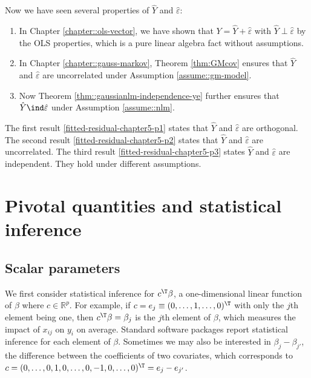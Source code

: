 Now we have seen several properties of $\hat{Y} $ and $  \hat{\varepsilon}$:
\begin{enumerate}[label=(P\arabic*), ref=P\arabic*]
\item\label{fitted-residual-chapter5-p1}
In Chapter \ref{chapter::ols-vector}, we have shown that $Y = \hat{Y}  + \hat{\varepsilon}$ with $\hat{Y}  \perp  \hat{\varepsilon}$ by the OLS properties, which is a pure linear algebra fact without assumptions.
\item\label{fitted-residual-chapter5-p2}
In Chapter \ref{chapter::gauss-markov}, Theorem \ref{thm:GMcov} ensures that $\hat{Y} $ and $  \hat{\varepsilon}$ are uncorrelated under Assumption \ref{assume::gm-model}.
\item\label{fitted-residual-chapter5-p3}
Now Theorem \ref{thm::gaussianlm-independence-ye} further ensures that $\hat{Y}  \ind  \hat{\varepsilon}$ under Assumption \ref{assume::nlm}.
\end{enumerate}


The first result \eqref{fitted-residual-chapter5-p1} states that $\hat{Y} $ and $  \hat{\varepsilon}$
are orthogonal. 
The second result \eqref{fitted-residual-chapter5-p2} states that $\hat{Y} $ and $  \hat{\varepsilon}$ are uncorrelated. 
The third result \eqref{fitted-residual-chapter5-p3} states $\hat{Y} $ and $  \hat{\varepsilon}$ are independent. 
They hold under different assumptions. 



\section{Pivotal quantities and statistical inference}

\subsection{Scalar parameters}
We first consider statistical inference for $c ^{\T}\beta$,
a one-dimensional linear function of $\beta$ where $c \in\mathbb{R}^{p}.$
For example, if $c = e_j \equiv   (0,\ldots,1,\ldots,0)^{\T}$ with only the
$j$th element being one, then $c ^{\T}\beta=\beta_{j}$ is the
$j$th element of $\beta$, which measures the impact of $x_{ij}$
on $y_{i}$ on average. Standard software packages report statistical
inference for each element of $\beta$. Sometimes we may also be interested in $\beta_j - \beta_{j'}$, the difference between the coefficients of two covariates, which corresponds to $c=(0, \ldots,0,1,0,\ldots,0,-1,0,\ldots,0)^{\T} = e_j - e_{j'}$. 

